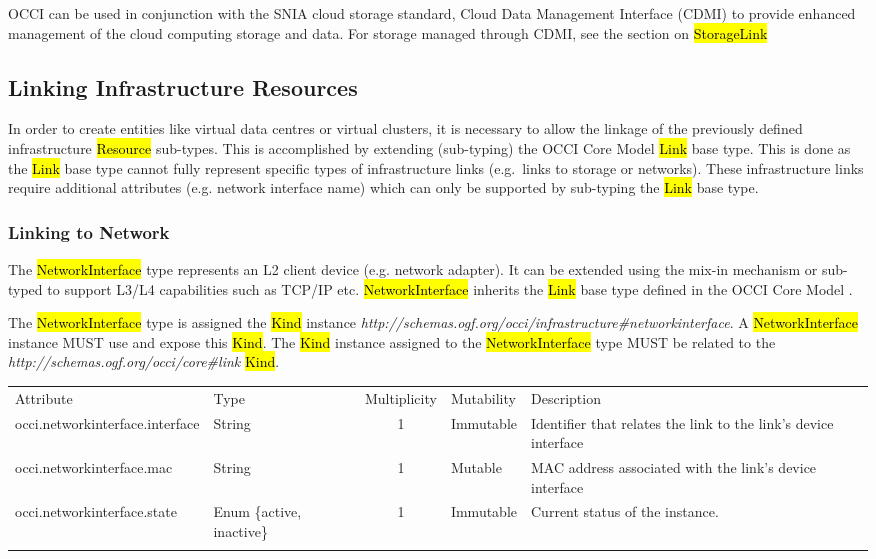 \documentclass[10pt,a4paper]{article}
\begin{document}
OCCI can be used in conjunction with the SNIA cloud storage standard,
Cloud Data Management Interface (CDMI) \cite{cdmi} to provide enhanced
management of the cloud computing storage and data. For storage
managed through CDMI, see the section on \hl{StorageLink}

\subsection{Linking Infrastructure Resources}
In order to create entities like virtual data centres or virtual
clusters, it is necessary to allow the linkage of the previously
defined infrastructure \hl{Resource} sub-types. This is accomplished
by extending (sub-typing) the OCCI Core Model \hl{Link} base type.
This is done as the \hl{Link} base type cannot fully represent
specific types of infrastructure links (e.g.~links to storage or
networks).  These infrastructure links require additional attributes
(e.g.  network interface name) which can only be supported by
sub-typing the \hl{Link} base type.

\subsubsection{Linking to Network}
The \hl{NetworkInterface} type represents an L2 client device (e.g.
network adapter). It can be extended using the mix-in mechanism or
sub-typed to support L3/L4 capabilities such as TCP/IP etc.
\hl{NetworkInterface} inherits the \hl{Link} base type defined in the
OCCI Core Model \cite{occi:core}.

The \hl{NetworkInterface} type is assigned the \hl{Kind} instance
\textit{http://schemas.ogf.org/occi/infrastructure\#networkinterface}.
A \hl{NetworkInterface} instance MUST use and expose this \hl{Kind}.
The \hl{Kind} instance assigned to the \hl{NetworkInterface} type MUST
be related to the \textit{http://schemas.ogf.org/occi/core\#link}
\hl{Kind}.

{
	\begin{tabular}{lp{1.8cm}clp{5cm}}
	\toprule
	Attribute&Type&Multi\-plicity&Mutability&Description\\
	\colrule
	occi.networkinterface.interface & String & 1 & Immutable 
	& Identifier that relates the link to the link's device interface\\
	occi.networkinterface.mac & String & 1 & Mutable 
	& MAC address associated with the link's device interface\\
	occi.networkinterface.state & Enum \{active, inactive\}& 1 
	& Immutable & Current status of the instance.\\
	\botrule
	\end{tabular}
}
\end{document}
